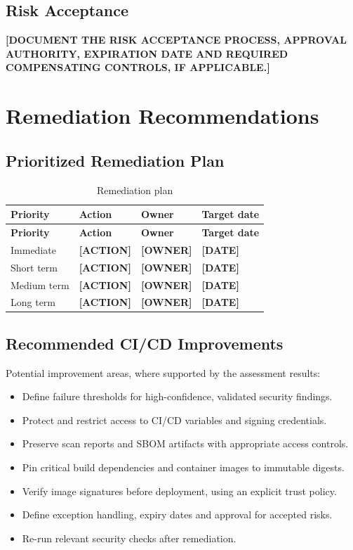 \documentclass[11pt,a4paper]{report}
\newcommand{\placeholder}[1]{\textbf{[#1]}}
\begin{document}
\section{Risk Acceptance}
\placeholder{DOCUMENT THE RISK ACCEPTANCE PROCESS, APPROVAL AUTHORITY,
EXPIRATION DATE AND REQUIRED COMPENSATING CONTROLS, IF APPLICABLE.}

\chapter{Remediation Recommendations}

\section{Prioritized Remediation Plan}
\begin{longtable}{@{}p{22mm}p{65mm}p{28mm}p{35mm}@{}}
    \caption{Remediation plan}\\
    \toprule
    \textbf{Priority} & \textbf{Action} & \textbf{Owner} & \textbf{Target date} \\
    \midrule
    \endfirsthead
    \toprule
    \textbf{Priority} & \textbf{Action} & \textbf{Owner} & \textbf{Target date} \\
    \midrule
    \endhead
    Immediate & \placeholder{ACTION} & \placeholder{OWNER} & \placeholder{DATE} \\
    Short term & \placeholder{ACTION} & \placeholder{OWNER} & \placeholder{DATE} \\
    Medium term & \placeholder{ACTION} & \placeholder{OWNER} & \placeholder{DATE} \\
    Long term & \placeholder{ACTION} & \placeholder{OWNER} & \placeholder{DATE} \\
    \bottomrule
\end{longtable}

\section{Recommended CI/CD Improvements}
Potential improvement areas, where supported by the assessment results:
\begin{itemize}
    \item Define failure thresholds for high-confidence, validated security findings.
    \item Protect and restrict access to CI/CD variables and signing credentials.
    \item Preserve scan reports and SBOM artifacts with appropriate access controls.
    \item Pin critical build dependencies and container images to immutable digests.
    \item Verify image signatures before deployment, using an explicit trust policy.
    \item Define exception handling, expiry dates and approval for accepted risks.
    \item Re-run relevant security checks after remediation.
\end{itemize}
\end{document}
